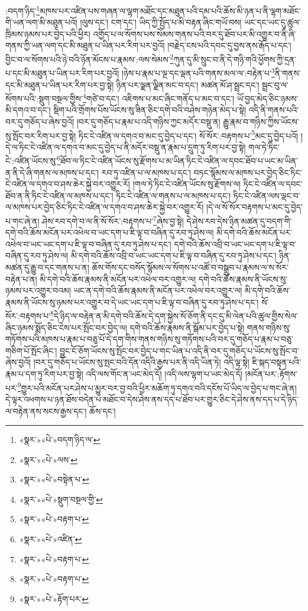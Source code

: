 :བདག་ཉིད་\footnote{«སྣར་»«པེ་»བདག་ཉིད་ལ་}མཁས་པར་འཛིན་པས་གཞན་ལ་ལྷག་མཐོང་དང་མཐུན་པའི་དམ་པའི་ཆོས་མི་ཉན་པ་ནི་ལྷག་མཐོང་གི་ཡན་ལག་མི་མཐུན་པའོ། །ལུས་དང་། ངག་དང་། ཡིད་ཀྱི་སྤྱོད་པ་མི་བརྟན་ཞིང་གཡོ་བས། ཡང་དང་ཡང་དུ་ཚུལ་ཁྲིམས་ཉམས་པར་བྱེད་པའི་ཕྱིར། འགྱོད་པ་ལ་སོགས་པས་སེམས་གནས་པའི་བར་དུ་ཐོབ་པར་མི་འགྱུར་བ་ནི་ཞི་གནས་ཀྱི་ཡན་ལག་དང་མི་མཐུན་པ་ཡིན་པར་རིག་པར་བྱའོ། །བརྗེད་ངས་པའི་དབང་དུ་བྱས་ནས་རྒོད་པ་དང་། བྱིང་བ་ལ་སོགས་པའི་ཉེ་བའི་ཉོན་མོངས་པ་རྣམས་:ལས་སེམས་\footnote{«སྣར་»«པེ་»ལས་}ཀུན་དུ་མི་སྲུང་བ་ནི་དེ་གཉི་གའི་ཕྱོགས་ཀྱི་དྲན་པ་དང་མི་མཐུན་པ་ཡིན་པར་རིག་པར་བྱའོ། །ཉེས་པ་རྣམ་པ་ལྔ་དང་ལྡན་པའི་གནས་མལ་ལ་:བརྟེན་པ་\footnote{«སྣར་»«པེ་»བསྟེན་པ་}ནི་གནས་དང་མི་མཐུན་པ་ཡིན་པར་རིག་པར་བྱ་སྟེ། ཉིན་པར་ལྗན་ལྗིན་མང་བ་དང་། མཚན་མོ་ཤ་སྦྲང་དང་། སྦྲང་བུ་ལ་སོགས་པའི་:སྡུག་བསྔལ་གྱིས་\footnote{«སྣར་»«པེ་»སྡུག་བསྔལ་གྱི་}གཙེ་བ་དང་། འཇིགས་པ་མང་ཞིང་གནོད་པ་མང་བ་དང་། ཡོ་བྱད་མེད་ཅིང་ཉམས་མི་དགའ་བ་དང་། སྡིག་པའི་གྲོགས་པོས་ཡོངས་སུ་ཟིན་ཅིང་དགེ་བའི་བཤེས་གཉེན་མེད་པ་སྟེ། འདི་ནི་གནས་པའི་བར་དུ་གཅོད་པ་ཞེས་བྱའོ། །བར་དུ་གཅོད་པ་རྣམ་པ་འདི་གཉིས་ཀྱང་མདོར་བསྡུ་ན། རྒྱུ་རྣམ་བ་གཉིས་ཀྱིས་ཡོངས་སུ་སྤོང་བར་རིག་པར་བྱ་སྟེ། ཏིང་ངེ་འཛིན་ལ་དགའ་བ་མང་དུ་བྱེད་པ་དང་། སོ་སོར་:བརྟགས་པ་\footnote{«སྣར་»«པེ་»བརྟག་པ་}མང་དུ་བྱེད་པའོ། །དེ་ལ་ཏིང་ངེ་འཛིན་ལ་དགའ་བ་མང་དུ་བྱེད་པ་ནི་མདོར་བསྡུ་ན་རྣམ་པ་དྲུག་ཏུ་རིག་པར་བྱ་སྟེ། གལ་ཏེ་ཏིང་ངེ་:འཛིན་ཡོངས་སུ་\footnote{«སྣར་»«པེ་»འཛིན་}ཐོབ་ལ་ཏིང་ངེ་འཛིན་ཡོངས་སུ་རྫོགས་པ་མ་ཡིན་ཏིང་ངེ་འཛིན་ལ་དབང་ཐོབ་པ་ཡང་མ་ཡིན་ན་ནི་དེ་ཞི་གནས་ལ་མཁས་པ་དང་། རབ་ཏུ་འཛིན་པ་ལ་མཁས་པ་དང་། བཏང་སྙོམས་ལ་མཁས་པར་བྱེད་ཅིང་ཏིང་ངེ་འཛིན་ལ་དགའ་བ་ཤས་ཆེར་སྐྱེ་བར་འགྱུར་རོ། །གལ་ཏེ་ཏིང་ངེ་འཛིན་ཡོངས་སུ་རྫོགས་ལ། ཏིང་ངེ་འཛིན་ལ་དབང་ཐོབ་ན་ནི་ཏིང་ངེ་འཛིན་ལ་མཁས་པ་དང་། ཏིང་ངེ་འཛིན་ལ་གནས་པ་ལ་མཁས་པ་དང་། ཏིང་ངེ་འཛིན་ལས་ལྡང་བ་ལ་མཁས་པར་བྱེད་ཅིང་ཏིང་ངེ་འཛིན་ལ་དགའ་བ་ཤས་ཆེར་སྐྱེ་བར་འགྱུར་རོ། །དེ་ལ་སོ་སོར་བརྟགས་པ་མང་དུ་བྱེད་པ་གང་ཞེ་ན། ཤེས་རབ་དགེ་བ་ལ་ནི་སོ་སོར་:བརྟགས་པ་\footnote{«སྣར་»«པེ་»བརྟག་པ་}ཞེས་བྱ་སྟེ། དེ་ཤེས་རབ་དེས་ཉིན་མཚན་དུ་བདག་གི་དགེ་བའི་ཆོས་མངོན་པར་འཕེལ་བ་ཡང་དག་པ་ཇི་ལྟ་བ་བཞིན་དུ་རབ་ཏུ་ཤེས་ལ། མི་དགེ་བའི་ཆོས་མངོན་པར་འཕེལ་བ་ཡང་ཡང་དག་པ་ཇི་ལྟ་བ་བཞིན་དུ་རབ་ཏུ་ཤེས་པ་དང་། དགེ་བའི་ཆོས་འབྲི་བ་ཡང་ཡང་དག་པ་ཇི་ལྟ་བ་བཞིན་དུ་རབ་ཏུ་ཤེས་ལ། མི་དགེ་བའི་ཆོས་འབྲི་བ་ཡང་ཡང་དག་པ་ཇི་ལྟ་བ་བཞིན་དུ་རབ་ཏུ་ཤེས་པ་དང་། ཉིན་མཚན་དུ་རྒྱུ་བ་དང་གནས་པ་ན། ཆོས་གོས་དང་བསོད་སྙོམས་ལ་སོགས་པ་འཚོ་བ་བསྒྲུབ་པ་རྣམས་ལ་ས་སོར་བརྟེན་པ་ན། མི་དགེ་བའི་ཆོས་རྣམས་ནི་མངོན་པར་འཕེལ་བར་འགྱུར་ལ། དགེ་བའི་ཆོས་རྣམས་ནི་ཡོངས་སུ་ཉམས་པར་འགྱུར་བའམ། ཡང་ན་དགེ་བའི་ཆོས་རྣམས་ནི་མངོན་པར་འཕེལ་བར་འགྱུར་ལ། མི་དགེ་བའི་ཆོས་རྣམས་ནི་ཡོངས་སུ་ཉམས་པར་འགྱུར་བ་དེ་ཡང་ཡང་དག་པ་ཇི་ལྟ་བ་བཞིན་དུ་རབ་ཏུ་ཤེས་པ་དང་། སོ་སོར་:བརྟགས་པ་\footnote{«སྣར་»«པེ་»བརྟག་པ་}དེ་ཉིད་ལ་བརྟེན་ན་མི་དགེ་བའི་ཆོས་དེ་དག་སྐྱེས་སོ་ཅོག་ནི་དང་དུ་མི་ལེན་པའི་ཚུལ་གྱིས་སེལ་ཞིང་ཉམས་སྨོད་ཅིང་ངེས་པར་སྤོང་བར་བྱེད་ལ། དགེ་བའི་ཆོས་རྣམས་ནི་སྒོམ་པར་བྱེད་པ་སྟེ། གནས་གཉིས་སུ་གཏོགས་པའི་མཁས་པ་རྣམ་པ་བཅུ་པོ་དེ་དག་གིས་གནས་གཉིས་སུ་གཏོགས་པའི་བར་དུ་གཅོད་པ་རྣམ་པ་བཅུ་གཅིག་པོ་སྤོང་ཞིང་། བྱུང་ངོ་ཅོག་ཡོངས་སུ་སྤོང་བར་བྱེད་པ་གང་ཡིན་པ་འདི་ནི་བར་དུ་གཅོད་པ་ཡོངས་སུ་སྤོང་བ་ཞེས་བྱའོ། །བར་དུ་གཅོད་པ་ཡོངས་སུ་སྤང་བའི་དོན་འདིའི་རྒྱས་པར་ནི་འདི་ཡིན་ཏེ། འདི་ལྟ་སྟེ། ཇི་སྐད་བསྟན་པའི་རྣམ་པ་དག་ཏུ་རིག་པར་བྱ་སྟེ། འདི་ལས་གོང་ན་ཡང་མེད་དོ། །འདི་ལས་ལྷག་པ་ཡང་མེད་དོ། །མངོན་པར་:རྟོགས་པར་\footnote{«སྣར་»«པེ་»རྟོག་པར་}གྱུར་པའི་མངོན་པར་ཤེས་པ་མྱུར་བར་བྱ་བའི་ཕྱིར་མཆོག་ཏུ་དགའ་བའི་དངོས་པོ་ཡིད་ལ་བྱེད་པ་གང་ཞེ་ན། དེ་ལྟར་འཕགས་པ་ཉན་ཐོས་བདེན་པ་མཐོང་བ་དེས་ཤེས་ནས་དད་པ་ཐོབ་པར་གྱུར་ཅིང་དེ་ཤེས་ནས་དད་པ་དེ་ཉིད་ལ་བརྟེན་ནས་སངས་རྒྱས་དང་། ཆོས་དང་། 